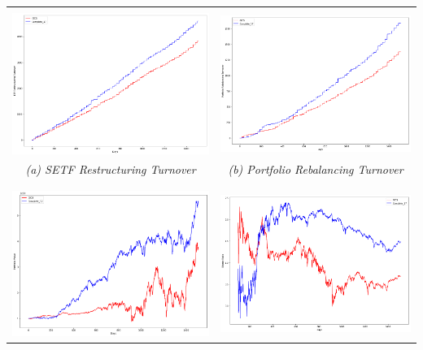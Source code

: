 \documentclass[../main.tex]{subfiles}
\begin{document}
\begin{table}[!h]
    \centering
    \begin{tabular}{|c|c|}
        \hline
        & \\
        \includegraphics[width=.475\linewidth]{images/etf_restrut_compare.png} &
        \includegraphics[width=.475\linewidth]{images/port_rebal_compare.png} \\
        \textit{(a) SETF Restructuring Turnover} & \textit{(b) Portfolio Rebalancing Turnover} \\
        & \\
        \hline
        & \\
        \includegraphics[width=.475\linewidth]{images/value_compare.png} &
        \includegraphics[width=.475\linewidth]{images/sharpe_compare.png} \\

\end{tabular}
\end{table}
\end{document}
